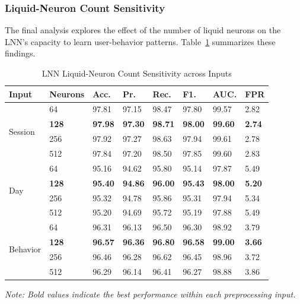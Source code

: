\subsubsection{Liquid-Neuron Count Sensitivity}
The final analysis explores the effect of the number of liquid neurons on the LNN’s capacity to learn user-behavior patterns. Table~\ref{tab:lnn_neurons_sensitivity_all} summarizes these findings.

\begin{table}[!ht]
\centering
\caption{LNN Liquid-Neuron Count Sensitivity across Inputs}
\label{tab:lnn_neurons_sensitivity_all}
\renewcommand{\arraystretch}{1.3}
\setlength{\tabcolsep}{5pt}
\small
\begin{tabular}{|l|l|l|l|l|l|l|l|}
\hline
\textbf{Input} & \textbf{Neurons} & \textbf{Acc.} & \textbf{Pr.} & \textbf{Rec.} & \textbf{F1.} & \textbf{AUC.} & \textbf{FPR} \\
\hline

\multirow{4}{*}{Session} 
 & 64  & 97.81 & 97.15 & 98.47 & 97.80 & 99.57 & 2.82 \\ \cline{2-8}
 & \textbf{128} & \textbf{97.98} & \textbf{97.30} & \textbf{98.71} & \textbf{98.00} & \textbf{99.60} & \textbf{2.74} \\ \cline{2-8}
 & 256 & 97.92 & 97.27 & 98.63 & 97.94 & 99.61 & 2.78 \\ \cline{2-8}
 & 512 & 97.84 & 97.20 & 98.50 & 97.85 & 99.60 & 2.83 \\
\hline

\multirow{4}{*}{Day} 
 & 64  & 95.16 & 94.62 & 95.80 & 95.14 & 97.87 & 5.49 \\ \cline{2-8}
 & \textbf{128} & \textbf{95.40} & \textbf{94.86} & \textbf{96.00} & \textbf{95.43} & \textbf{98.00} & \textbf{5.20} \\ \cline{2-8}
 & 256 & 95.32 & 94.78 & 95.86 & 95.31 & 97.94 & 5.34 \\ \cline{2-8}
 & 512 & 95.20 & 94.69 & 95.72 & 95.19 & 97.88 & 5.49 \\
\hline

\multirow{4}{*}{Behavior} 
 & 64  & 96.31 & 96.13 & 96.50 & 96.30 & 98.92 & 3.79 \\ \cline{2-8}
 & \textbf{128} & \textbf{96.57} & \textbf{96.36} & \textbf{96.80} & \textbf{96.58} & \textbf{99.00} & \textbf{3.66} \\ \cline{2-8}
 & 256 & 96.46 & 96.28 & 96.62 & 96.45 & 98.96 & 3.72 \\ \cline{2-8}
 & 512 & 96.29 & 96.14 & 96.41 & 96.27 & 98.88 & 3.86 \\
\hline
\end{tabular}

\vspace{2mm}
\scriptsize{\textit{Note: Bold values indicate the best performance within each preprocessing input.}}
\end{table}


